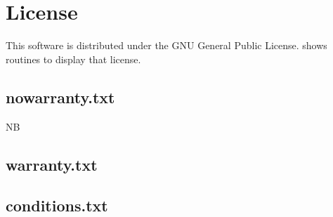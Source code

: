 \documentclass[twocolumn,global]{tex4log/svjour}
\newcommand{\ME}{NB} %
\begin{document}
\appendix

\section{License}\label{sec:license}

This software is distributed under the  GNU General Public License.
 shows routines to display that license.

\subsection{nowarranty.txt}\label{sec:nowar}
{\scriptsize \ME~ 

}

\subsection{warranty.txt}\label{sec:war}
{\scriptsize

}

\subsection{conditions.txt}\label{sec:cond}
{\scriptsize

}
\end{document}
